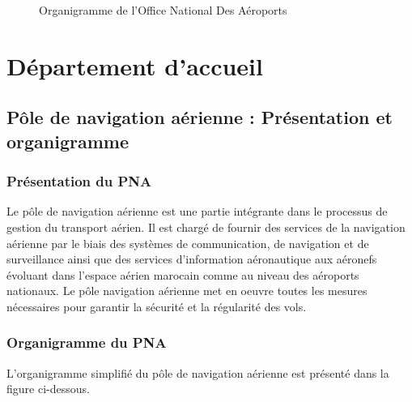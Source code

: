 \documentclass[12pt, a4paper, oneside]{report}
\begin{document}
\begin{figure}[H]
  \caption{Organigramme de l'Office National Des Aéroports}
  \label{fig:organigramme}
\end{figure}

\newpage
\section{Département d’accueil}
\subsection{Pôle de navigation aérienne : Présentation et organigramme}
\subsubsection{Présentation du PNA}

Le pôle de navigation aérienne est une partie intégrante dans le processus de gestion du
transport aérien. Il est chargé de fournir des services de la navigation aérienne par le biais des
systèmes de communication, de navigation et de surveillance ainsi que des services
d’information aéronautique aux aéronefs évoluant dans l’espace aérien marocain comme au
niveau des aéroports nationaux. Le pôle navigation aérienne met en oeuvre toutes les mesures
nécessaires pour garantir la sécurité et la régularité des vols.

\subsubsection{Organigramme du PNA}
L’organigramme simplifié du pôle de navigation aérienne est présenté dans la figure ci-dessous.
\end{document}
